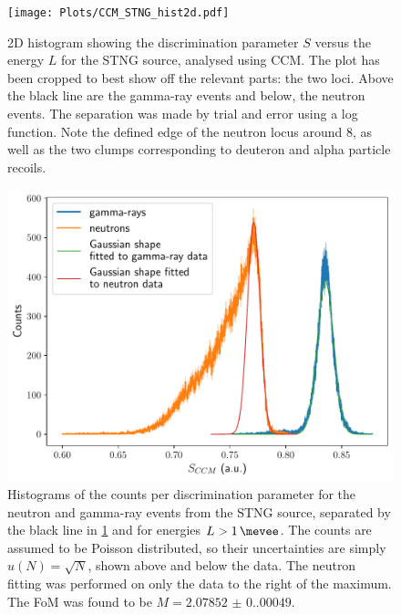 \documentclass[11pt]{article}
\numberwithin{equation}{section}
\numberwithin{figure}{section}
\numberwithin{table}{section}
\begin{document}
\begin{figure}[H]
    \begin{center}
        \texttt{[image: Plots/CCM\_STNG\_hist2d.pdf]}
        \caption{2D histogram showing the discrimination parameter $S$ versus the energy $L$ for the STNG source, analysed using CCM. The plot has been cropped to best show off the relevant parts: the two loci. Above the black line are the gamma-ray events and below, the neutron events. The separation was made by trial and error using a log function. Note the defined edge of the neutron locus around \SI{8}{\mevee}, as well as the two clumps corresponding to deuteron and alpha particle recoils.}
        \label{fig:CCM_STNG_hist2d}
    \end{center}
\end{figure}

\begin{figure}[H]
    \begin{center}
        \includegraphics[scale=0.73]{Plots/CCM_STNG_separation_hist.pdf}
        \caption{Histograms of the counts per discrimination parameter for the neutron and gamma-ray events from the STNG source, separated by the black line in \cref{fig:CCM_STNG_hist2d} and for energies $L>\SI{1}{\mevee}$. The counts are assumed to be Poisson distributed, so their uncertainties are simply $u(N)=\sqrt{N}$, shown above and below the data. The neutron fitting was performed on only the data to the right of the maximum. The FoM was found to be $M=\num{2.07852(0.00049)}$.}
        \label{fig:CCM_STNG_separation_hist}
    \end{center}
\end{figure}
\end{document}
